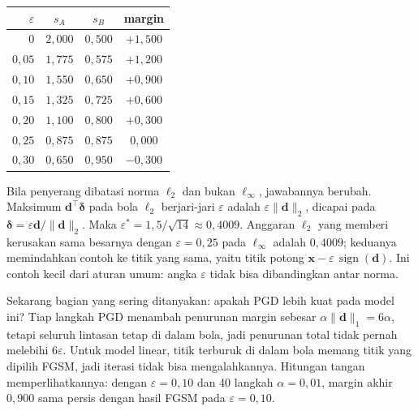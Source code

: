 \begin{center}
\begin{tabular}{rccc}
\hline
$\varepsilon$ & $s_A$ & $s_B$ & margin \\
\hline
$0$    & $2{,}000$ & $0{,}500$ & $+1{,}500$ \\
$0{,}05$ & $1{,}775$ & $0{,}575$ & $+1{,}200$ \\
$0{,}10$ & $1{,}550$ & $0{,}650$ & $+0{,}900$ \\
$0{,}15$ & $1{,}325$ & $0{,}725$ & $+0{,}600$ \\
$0{,}20$ & $1{,}100$ & $0{,}800$ & $+0{,}300$ \\
$0{,}25$ & $0{,}875$ & $0{,}875$ & $0{,}000$ \\
$0{,}30$ & $0{,}650$ & $0{,}950$ & $-0{,}300$ \\
\hline
\end{tabular}
\end{center}

Bila penyerang dibatasi norma $\ell_2$ dan bukan $\ell_\infty$, jawabannya berubah.
Maksimum $\mathbf{d}^{\top}\boldsymbol{\delta}$ pada bola $\ell_2$ berjari-jari
$\varepsilon$ adalah $\varepsilon\lVert\mathbf{d}\rVert_2$, dicapai pada
$\boldsymbol{\delta}=\varepsilon\mathbf{d}/\lVert\mathbf{d}\rVert_2$. Maka
$\varepsilon^{*}=1{,}5/\sqrt{14}\approx0{,}4009$. Anggaran $\ell_2$ yang memberi
kerusakan sama besarnya dengan $\varepsilon=0{,}25$ pada $\ell_\infty$ adalah
$0{,}4009$; keduanya memindahkan contoh ke titik yang sama, yaitu titik potong
$\mathbf{x}-\varepsilon\,\operatorname{sign}(\mathbf{d})$. Ini contoh kecil dari aturan
umum: angka $\varepsilon$ tidak bisa dibandingkan antar norma.

Sekarang bagian yang sering ditanyakan: apakah PGD lebih kuat pada model ini? Tiap
langkah PGD menambah penurunan margin sebesar $\alpha\lVert\mathbf{d}\rVert_1
=6\alpha$, tetapi seluruh lintasan tetap di dalam bola, jadi penurunan total tidak
pernah melebihi $6\varepsilon$. Untuk model linear, titik terburuk di dalam bola
memang titik yang dipilih FGSM, jadi iterasi tidak bisa mengalahkannya. Hitungan
tangan memperlihatkannya: dengan $\varepsilon=0{,}10$ dan 40 langkah
$\alpha=0{,}01$, margin akhir $0{,}900$ sama persis dengan hasil FGSM pada
$\varepsilon=0{,}10$.


